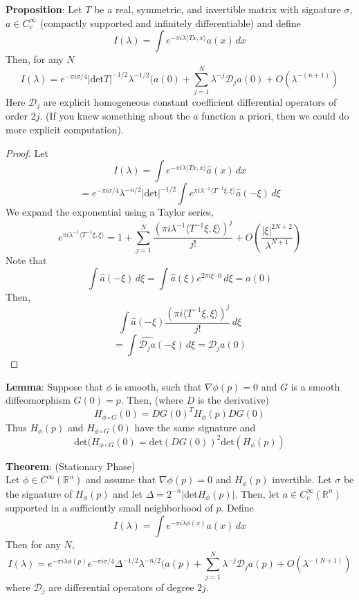 \documentclass[12pt]{article}
\begin{document}
\noindent \textbf{Proposition}: Let $T$ be a real, symmetric, and invertible matrix with signature $\sigma$, $a \in C_c^\infty$ (compactly supported and infinitely differentiable) and define
$$I(\lambda) = \int e^{-\pi i \lambda \langle Tx, x \rangle} a(x) \, dx$$
Then, for any $N$
$$I(\lambda) = e^{-\pi i \sigma/4} \vert \text{det} T \vert^{-1/2} \lambda^{-1/2} (a(0) + \sum^N_{j=1} \lambda^{-j} \mathcal{D}_ja(0) + O(\lambda^{-(n+1)})$$
Here $\mathcal{D}_j$ are explicit homogeneous constant coefficient differential operators of order $2j$. (If you knew something about the $a$ function a priori, then we could do more explicit computation). 

\begin{proof}
Let 
$$I(\lambda) = \int e^{-\pi i \lambda \langle Tx, x \rangle} \hat{a}(x) \,dx $$
$$= e^{-\pi i \sigma/4} \lambda^{-n/2} \vert \text{det} \vert^{-1/2} \int e^{\pi i \lambda^{-1} \langle T^{-1} \xi, \xi \rangle} \hat{a}(-\xi) \, d\xi $$
We expand the exponential using a Taylor series,
$$e^{\pi i \lambda^{-1} \langle T^{-1} \xi, \xi\rangle} = 1 + \sum^N_{j=1} \frac{(\pi i \lambda^{-1}\langle T^{-1} \xi, \xi\rangle)^j}{j!} + O(\frac{\vert \xi \vert^{2N+2}}{\lambda^{N+1}})$$
Note that 
$$\int \hat{a}(-\xi) \,d\xi = \int \hat{a}(\xi) e^{2\pi i \xi \cdot 0} \, d\xi = a(0)$$
Then,
$$\int \hat{a}(-\xi) \frac{(\pi i \langle T^{-1}\xi, \xi \rangle)^j}{j!} \, d\xi$$
$$= \int \widehat{\mathcal{D}_ja}(-\xi) \,d\xi = \mathcal{D}_ja(0)$$ 
\end{proof} 
\noindent \textbf{Lemma}: Suppose that $\phi$ is smooth, such that $\nabla \phi(p) = 0$ and $G$ is a smooth diffeomorphism $G(0)=p$. Then, (where $D$ is the derivative)
$$H_{\phi \circ G} (0) = DG(0)^TH_\phi(p)DG(0)$$
Thus $H_\phi(p)$ and $H_{\phi \circ G}(0)$ have the same signature and 
$$\text{det} ( H_{\phi \circ G}(0)= \text{det} (DG(0))^2 \text{det}(H_{\phi}(p))$$

\noindent \textbf{Theorem}: (Stationary Phase) \\
\noindent Let $\phi \in C^\infty(\mathbb{R}^n)$ and assume that $\nabla \phi(p) =0$ and $H_\phi(p)$ invertible. Let $\sigma$ be the signature of $H_\phi(p)$ and let $\Delta = 2^{-n} \vert \text{det} H_\phi(p) \vert$. Then, let $a \in C_c^\infty(\mathbb{R}^n)$ supported in a sufficiently small neighborhood of $p$. Define
$$I(\lambda) = \int e^{-\pi i \lambda \phi (x)}a(x) \,dx$$
Then for any $N$, 
$$I(\lambda)= e^{-\pi i \lambda \phi(p)} e^{-\pi i \sigma/4} \Delta^{-1/2} \lambda^{-n/2}(a(p) + \sum^N_{j=1} \lambda^{-j}\mathcal{D}_ja(p) + O(\lambda^{-(N+1)})$$
where $\mathcal{D}_j$ are differential operators of degree $2j$. \\
\end{document}
